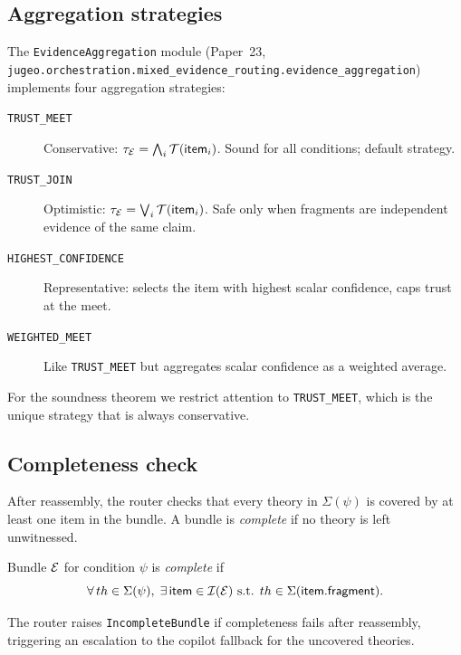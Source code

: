 \documentclass[11pt]{article}
\newcommand{\VC}{\psi}                    %
\begin{document}
\subsection{Aggregation strategies}\label{sec:aggregation}

The \texttt{EvidenceAggregation} module (Paper~23,
\texttt{jugeo.orchestration.mixed\_evidence\_routing.evidence\_aggregation})
implements four aggregation strategies:

\begin{description}
  \item[\texttt{TRUST\_MEET}] Conservative: $\tau_{\mathcal{E}} = \bigwedge_i \mathcal{T}(\mathsf{item}_i)$.
    Sound for all conditions; default strategy.
  \item[\texttt{TRUST\_JOIN}] Optimistic: $\tau_{\mathcal{E}} = \bigvee_i \mathcal{T}(\mathsf{item}_i)$.
    Safe only when fragments are independent evidence of the same claim.
  \item[\texttt{HIGHEST\_CONFIDENCE}] Representative: selects the
    item with highest scalar confidence, caps trust at the meet.
  \item[\texttt{WEIGHTED\_MEET}] Like \texttt{TRUST\_MEET} but
    aggregates scalar confidence as a weighted average.
\end{description}

For the soundness theorem we restrict attention to \texttt{TRUST\_MEET},
which is the unique strategy that is always conservative.

\subsection{Completeness check}\label{sec:completeness}

After reassembly, the router checks that every theory in $\Sigma(\VC)$
is covered by at least one item in the bundle.  A bundle is
\emph{complete} if no theory is left unwitnessed.

\begin{definition}\label{def:completeness}
Bundle $\mathcal{E}$ for condition $\VC$ is \emph{complete} if
\[
  \forall\, th \in \Sigma(\VC),\;\exists\,\mathsf{item} \in \mathcal{I}(\evid)
  \text{ s.t. } th \in \Sigma(\mathsf{item.fragment}).
\]
\end{definition}

The router raises \texttt{IncompleteBundle} if completeness fails after
reassembly, triggering an escalation to the copilot fallback for the
uncovered theories.

\end{document}
